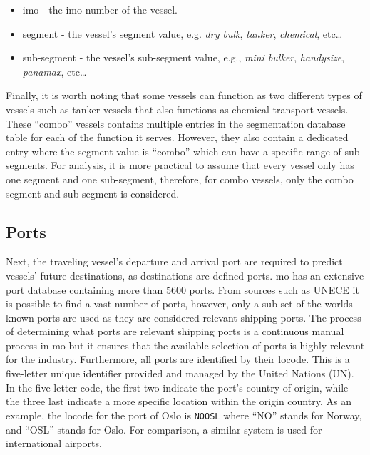 \begin{itemize}
    \item imo - the \acrshort{imo} number of the vessel.
    \item segment - the vessel's segment value, e.g. \textit{dry bulk}, \textit{tanker}, \textit{chemical}, etc\ldots
    \item sub-segment - the vessel's sub-segment value, e.g., \textit{mini bulker}, \textit{handysize}, \textit{panamax}, etc\ldots
\end{itemize}

Finally, it is worth noting that some vessels can function as two different types of vessels such as tanker vessels that also functions as chemical transport vessels. These ``combo'' vessels contains multiple entries in the segmentation database table for each of the function it serves. However, they also contain a dedicated entry where the segment value is ``combo'' which can have a specific range of sub-segments. For analysis, it is more practical to assume that every vessel only has one segment and one sub-segment, therefore, for combo vessels, only the combo segment and sub-segment is considered.

\subsection{Ports}

Next, the traveling vessel's departure and arrival port are required to predict vessels' future destinations, as destinations are defined ports. \acrshort{mo} has an extensive port database containing more than 5600 ports. From sources such as UNECE it is possible to find a vast number of ports, however, only a sub-set of the worlds known ports are used as they are considered relevant shipping ports. The process of determining what ports are relevant shipping ports is a continuous manual process in \acrshort{mo} but it ensures that the available selection of ports is highly relevant for the industry. Furthermore, all ports are identified by their \gls{locode}. This is a five-letter unique identifier provided and managed by the United Nations (UN). In the five-letter code, the first two indicate the port's country of origin, while the three last indicate a more specific location within the origin country. As an example, the \gls{locode} for the port of Oslo is \texttt{NOOSL} where ``NO'' stands for Norway, and ``OSL'' stands for Oslo. For comparison, a similar system is used for international airports.

